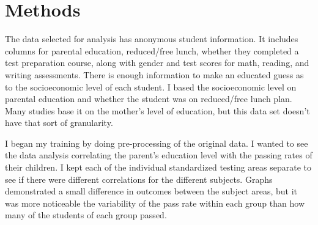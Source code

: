 \documentclass[fleqn,10pt]{olplainarticle}
\begin{document}
\section*{Methods}
The data selected for analysis has anonymous student information. It includes columns for parental education, reduced/free lunch, whether they completed a test preparation course, along with gender and test scores for math, reading, and writing assessments. There is enough information to make an educated guess as to the socioeconomic level of each student. I based the socioeconomic level on parental education and whether the student was on reduced/free lunch plan.  Many studies base it on the mother's level of education, but this data set doesn't have that sort of granularity. \citep{maternaleducation}

I began my training by doing pre-processing of the original data. I wanted to see the data analysis correlating the parent's education level with the passing rates of their children. I kept each of the individual standardized testing areas separate to see if there were different correlations for the different subjects. Graphs demonstrated a small difference in outcomes between the subject areas, but it was more noticeable the variability of the pass rate within each group than how many of the students of each group passed.
\linebreak[2]
\end{document}
